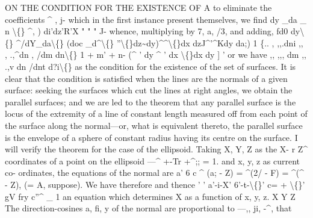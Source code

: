 \documentclass[12pt,a4paper]{article}
\begin{document}
ON THE CONDITION FOR THE EXISTENCE OF A
to
eliminate
the
coefficients
\textasciicircum{}
,
j-
which
in
the
first
instance
present
themselves,
we
find
dy \_da \_ n
\textbackslash\{\}
\textasciicircum{},
)
di'dz'R'X
"
"
"
J-
whence, multiplying by
7,
a,
/3, and adding,
fd0
dy\textbackslash\{\}
\textasciicircum{}/dY\_da\textbackslash\{\}
(doc \_d\textasciicircum{}\textbackslash\{\}
''\textbackslash\{\}dz\textasciitilde{}dy)\textasciicircum{}\textasciicircum{}\textbackslash\{\}dx
dzJ\textasciicircum{}'\textasciicircum{}Kdy
da;)
1
\{..
,
,,.dni
,,
,
.,\textasciicircum{}dn
,
/dm
dn\textbackslash\{\}
1 + m' + n-
(\textasciicircum{}
' dy
\textasciicircum{}
' dx
\textbackslash\{\}dx
dy
]
'
or we have
,,
,,, dm
,,
.,v dn
/dnt
d?i\textbackslash\{\}
as the condition
for the existence
of the
set of surfaces.
It
is
clear
that
the
condition
is
satisfied when
the
lines
are
the
normals
of
a
given
surface:
seeking
the
surfaces
which
cut
the
lines
at
right
angles, we
obtain
the
parallel
surfaces;
and we
are
led
to
the
theorem
that
any
parallel
surface
is
the
locus
of
the
extremity of a
line
of
constant
length measured
off
from each
point
of
the
surface
along
the
normal---or,
what
is
equivalent
thereto,
the
parallel
surface
is
the
envelope
of
a
sphere
of
constant
radius
having
its
centre
on
the
surface.
I
will
verify
the
theorem
for
the
case
of
the
ellipsoid.
Taking
X,
Y, Z
as
the
X-
r\guillemotright{}
Z\textasciicircum{}
coordinates
of
a
point
on
the
ellipsoid ---\textasciicircum{} +-Tr +\textasciicircum{};; = 1.
and
x,
y,
z
as
current
co-
ordinates, the equations of the normal are
a'
6\textdegree{}
c\textdegree{}
\textbullet{}\textasciicircum{} (a; - Z) = \textasciicircum{}(2/ - F) = \textasciicircum{}(\textasciicircum{} - Z), (= A, suppose).
We have
therefore
and thence
'
'
a'-i-X'
6'-t-\textbackslash\{\}'
c= + \textbackslash\{\}'
gV
fry
c''\textasciicircum{}\textdegree{}
\_
1
an equation which determines X as a function
of x,
y,
z.
X
Y
Z
The
direction-cosines
a,
fi,
y
of
the
normal
are
proportional
to ---,,
ji,
-\textasciicircum{},
that
\end{document}
